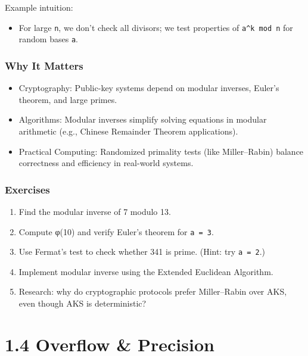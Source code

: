 \documentclass[
  letterpaper,
  DIV=11,
  numbers=noendperiod]{scrreprt}
\providecommand{\tightlist}{%
  \setlength{\itemsep}{0pt}\setlength{\parskip}{0pt}}
\begin{document}
Example intuition:

\begin{itemize}
\tightlist
\item
  For large \texttt{n}, we don't check all divisors; we test properties
  of \texttt{a\^{}k\ mod\ n} for random bases \texttt{a}.
\end{itemize}

\subsubsection{Why It Matters}\label{why-it-matters-8}

\begin{itemize}
\tightlist
\item
  Cryptography: Public-key systems depend on modular inverses, Euler's
  theorem, and large primes.
\item
  Algorithms: Modular inverses simplify solving equations in modular
  arithmetic (e.g., Chinese Remainder Theorem applications).
\item
  Practical Computing: Randomized primality tests (like Miller--Rabin)
  balance correctness and efficiency in real-world systems.
\end{itemize}

\subsubsection{Exercises}\label{exercises-8}

\begin{enumerate}
\def\labelenumi{\arabic{enumi}.}
\tightlist
\item
  Find the modular inverse of 7 modulo 13.
\item
  Compute φ(10) and verify Euler's theorem for \texttt{a\ =\ 3}.
\item
  Use Fermat's test to check whether 341 is prime. (Hint: try
  \texttt{a\ =\ 2}.)
\item
  Implement modular inverse using the Extended Euclidean Algorithm.
\item
  Research: why do cryptographic protocols prefer Miller--Rabin over
  AKS, even though AKS is deterministic?
\end{enumerate}

\section{1.4 Overflow \& Precision}\label{overflow-precision}
\end{document}
